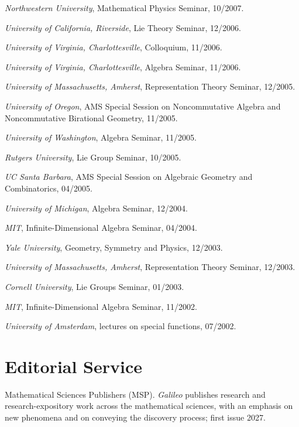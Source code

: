 \documentclass[11pt]{article}
\begin{document}
\begin{cvlist}
  \item \emph{Northwestern University}, Mathematical Physics Seminar,
    10/2007.
  \item \emph{University of California, Riverside}, Lie Theory Seminar,
    12/2006.
  \item \emph{University of Virginia, Charlottesville}, Colloquium, 11/2006.
  \item \emph{University of Virginia, Charlottesville}, Algebra Seminar,
    11/2006.
  \item \emph{University of Massachusetts, Amherst}, Representation Theory
    Seminar, 12/2005.
  \item \emph{University of Oregon}, AMS Special Session on Noncommutative
    Algebra and Noncommutative Birational Geometry, 11/2005.
  \item \emph{University of Washington}, Algebra Seminar, 11/2005.
  \item \emph{Rutgers University}, Lie Group Seminar, 10/2005.
  \item \emph{UC Santa Barbara}, AMS Special Session on Algebraic Geometry
    and Combinatorics, 04/2005.
  \item \emph{University of Michigan}, Algebra Seminar, 12/2004.
  \item \emph{MIT}, Infinite-Dimensional Algebra Seminar, 04/2004.
  \item \emph{Yale University}, Geometry, Symmetry and Physics, 12/2003.
  \item \emph{University of Massachusetts, Amherst}, Representation Theory
    Seminar, 12/2003.
  \item \emph{Cornell University}, Lie Groups Seminar, 01/2003.
  \item \emph{MIT}, Infinite-Dimensional Algebra Seminar, 11/2002.
  \item \emph{University of Amsterdam}, lectures on special functions,
    07/2002.
\end{cvlist}

\section{Editorial Service}

\begin{cventries}
    {Mathematical Sciences Publishers (MSP). \emph{Galileo} publishes
     research and research-expository work across the mathematical sciences,
     with an emphasis on new phenomena and on conveying the discovery
     process; first issue 2027.}
\end{cventries}
\end{document}
